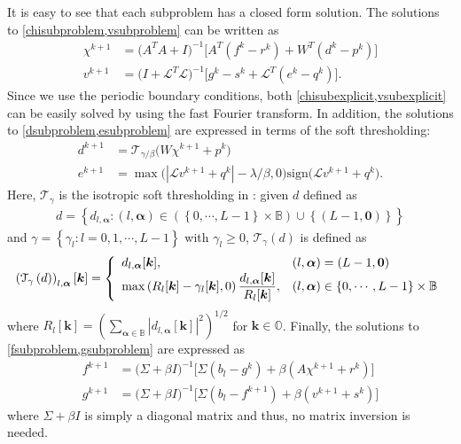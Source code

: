 \documentclass[reqno]{siamonline1116}
\numberwithin{theorem}{section}
\numberwithin{equation}{section}
\def\BB{{\mathbb B}}
\def\OO{{\mathbb O}}
\def\sign{\mathrm{sign}}
\def\f{\frac}
\def\bk{{\boldsymbol k}}
\def\mT{{\mathcal T}}
\def\msL{{\mathscr L}}
\def\aal{\boldsymbol{\alpha}}
\def\0{{\mathbf 0}}
\begin{document}
It is easy to see that each subproblem has a closed form solution. The solutions to \cref{chisubproblem,vsubproblem} can be written as
\begin{align}
\chi^{k+1}&=\big(A^TA+I\big)^{-1}\big[A^T(f^k-r^k)+W^T(d^k-p^k)\big] \label{chisubexplicit}\\
v^{k+1}&=\big(I+\msL^T\msL\big)^{-1}\big[g^k-s^k+\msL^T(e^k-q^k)\big]. \label{vsubexplicit}
\end{align}
Since we use the periodic boundary conditions, both \cref{chisubexplicit,vsubexplicit} can be easily solved by using the fast Fourier transform. In addition, the solutions to \cref{dsubproblem,esubproblem} are expressed in terms of the soft thresholding:
\begin{align}
d^{k+1}&=\mT_{\gamma/\beta}\big(W\chi^{k+1}+p^k\big) \label{dsubexplicit}\\
e^{k+1}&=\max\big(|\msL v^{k+1}+q^k|-\lambda/\beta,0\big)\sign\big(\msL v^{k+1}+q^k\big). \label{esubexplicit}
\end{align}
Here, $\mT_{\gamma}$ is the isotropic soft thresholding in \cite{J.F.Cai2012}: given $d$ defined as
\begin{align*}
d=\left\{d_{l,\aal}:(l,\aal)\in\left(\left\{0,\cdots,L-1\right\}\times\BB\right)\cup\left\{(L-1,\0)\right\}\right\}
\end{align*}
and $\gamma=\left\{\gamma_l:l=0,1,\cdots,L-1\right\}$ with $\gamma_l\geq0$, $\mT_{\gamma}\left(d\right)$ is defined as
\begin{align*}
\left(\mT_{\gamma}\left(d\right)\right)_{l,\aal}[\bk]=\left\{\begin{array}{ll}
d_{l,\aal}[\bk],&(l,\aal)=(L-1,\0)\vspace{0.125em}\\
\displaystyle{\max\left(R_l[\bk]-\gamma_l[\bk],0\right)\f{d_{l,\aal}[\bk]}{R_l[\bk]}},&(l,\aal)\in\left\{0,\cdots,L-1\right\}\times\BB
\end{array}\right.
\end{align*}
where $R_l[\bk]=\left(\sum_{\aal\in\BB}\left|d_{l,\aal}[\bk]\right|^2\right)^{1/2}$ for $\bk\in\OO$. Finally, the solutions to \cref{fsubproblem,gsubproblem} are expressed as
\begin{align}
f^{k+1}&=\big(\Sigma+\beta I\big)^{-1}\big[\Sigma(b_l-g^k)+\beta(A\chi^{k+1}+r^k)\big] \label{fsubexplicit}\\
g^{k+1}&=\big(\Sigma+\beta I\big)^{-1}\big[\Sigma(b_l-f^{k+1})+\beta(v^{k+1}+s^k)\big] \label{gsubexplicit}
\end{align}
where $\Sigma+\beta I$ is simply a diagonal matrix and thus, no matrix inversion is needed.
\end{document}
